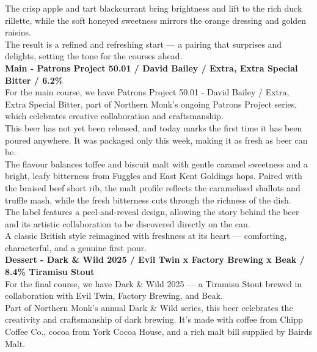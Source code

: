 \documentclass{lodgebrand}
\begin{document}
The crisp apple and tart blackcurrant bring brightness and lift to the rich duck rillette, while the soft honeyed sweetness mirrors the orange dressing and golden raisins.\\
The result is a refined and refreshing start — a pairing that surprises and delights, setting the tone for the courses ahead.\\

\vspace{4pt}\noindent{\color{black}\rule{\linewidth}{0.4pt}}\vspace{6pt}
\textbf{Main - Patrons Project 50.01 / David Bailey / Extra, Extra Special Bitter / 6.2\%}\\
For the main course, we have Patrons Project 50.01 - David Bailey / Extra, Extra Special Bitter, part of Northern Monk's ongoing Patrons Project series, which celebrates creative collaboration and craftsmanship.\\
This beer has not yet been released, and today marks the first time it has been poured anywhere. It was packaged only this week, making it as fresh as beer can be.\\

The flavour balances toffee and biscuit malt with gentle caramel sweetness and a bright, leafy bitterness from Fuggles and East Kent Goldings hops. Paired with the braised beef short rib, the malt profile reflects the caramelised shallots and truffle mash, while the fresh bitterness cuts through the richness of the dish.\\

The label features a peel-and-reveal design, allowing the story behind the beer and its artistic collaboration to be discovered directly on the can.\\

A classic British style reimagined with freshness at its heart — comforting, characterful, and a genuine first pour.\\

\vspace{4pt}\noindent{\color{black}\rule{\linewidth}{0.4pt}}\vspace{6pt}
\textbf{Dessert - Dark \& Wild 2025 / Evil Twin x Factory Brewing x Beak / 8.4\% Tiramisu Stout}\\
For the final course, we have Dark \& Wild 2025 — a Tiramisu Stout brewed in collaboration with Evil Twin, Factory Brewing, and Beak.\\
Part of Northern Monk's annual Dark \& Wild series, this beer celebrates the creativity and craftsmanship of dark brewing. It's made with coffee from Chipp Coffee Co., cocoa from York Cocoa House, and a rich malt bill supplied by Bairds Malt.\\
\end{document}
